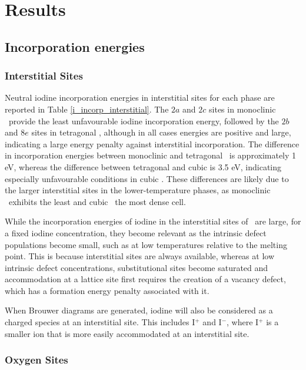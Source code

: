 \section{Results}

\subsection{Incorporation energies}

\subsubsection*{Interstitial Sites}
Neutral iodine incorporation energies in interstitial sites for each phase are reported in Table \ref{i_incorp_interstitial}. The $2a$ and $2c$ sites in monoclinic \zirconia\ provide the least unfavourable iodine incorporation energy, followed by the $2b$ and $8e$ sites in tetragonal \zirconia , although in all cases energies are positive and large, indicating a large energy penalty against interstitial incorporation. The difference in incorporation energies between monoclinic and tetragonal \zirconia\ is approximately 1 eV, whereas the difference between tetragonal and cubic is 3.5 eV, indicating especially unfavourable conditions in cubic \zirconia . These differences are likely due to the larger interstitial sites in the lower-temperature phases, as monoclinic \zirconia\ exhibits the least and cubic \zirconia\ the most dense cell. 

While the incorporation energies of iodine in the interstitial sites of \zirconia\ are large, for a fixed iodine concentration, they become relevant as the intrinsic defect populations become small, such as at low temperatures relative to the melting point. This is because interstitial sites are always available, whereas at low intrinsic defect concentrations, substitutional sites become saturated and accommodation at a lattice site first requires the creation of a vacancy defect, which has a formation energy penalty associated with it. 

When Brouwer diagrams are generated, iodine will also be considered as a charged species at an interstitial site. This includes I$^{+}$ and I$^{-}$, where I$^{+}$ is a smaller ion that is more easily accommodated at an interstitial site.

\subsubsection*{Oxygen Sites}

